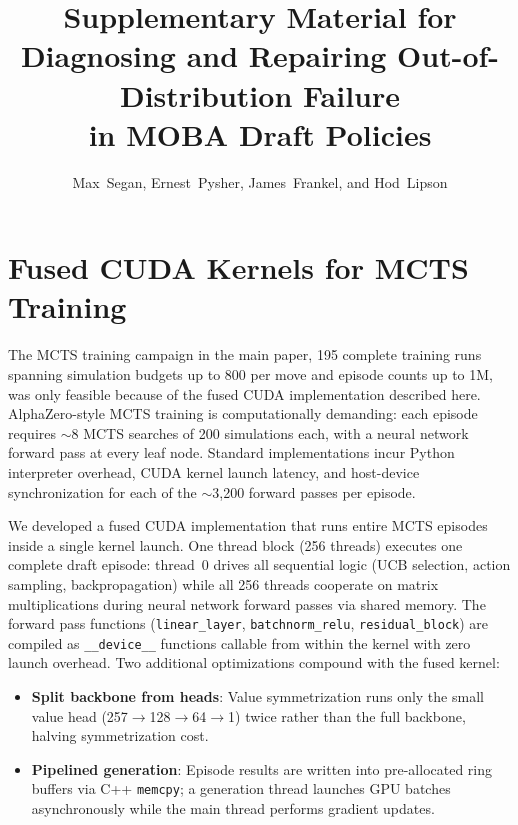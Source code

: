 \documentclass[journal]{IEEEtran}
\newif\ifanonymous
\begin{document}
\title{Supplementary Material for\\ Diagnosing and Repairing Out-of-Distribution Failure\\ in MOBA Draft Policies}
\ifanonymous
\author{Anonymous Authors}
\else
\author{Max~Segan, Ernest~Pysher, James~Frankel, and Hod~Lipson}
\fi
\maketitle

\section{Fused CUDA Kernels for MCTS Training}
\label{sec:cuda}

The MCTS training campaign in the main paper, 195 complete training runs spanning simulation budgets up to 800 per move and episode counts up to 1M, was only feasible because of the fused CUDA implementation described here. AlphaZero-style MCTS training is computationally demanding: each episode requires $\sim$8 MCTS searches of 200 simulations each, with a neural network forward pass at every leaf node. Standard implementations incur Python interpreter overhead, CUDA kernel launch latency, and host-device synchronization for each of the $\sim$3,200 forward passes per episode.

We developed a fused CUDA implementation that runs entire MCTS episodes inside a single kernel launch. One thread block (256 threads) executes one complete draft episode: thread~0 drives all sequential logic (UCB selection, action sampling, backpropagation) while all 256 threads cooperate on matrix multiplications during neural network forward passes via shared memory. The forward pass functions (\texttt{linear\_layer}, \texttt{batchnorm\_relu}, \texttt{residual\_block}) are compiled as \texttt{\_\_device\_\_} functions callable from within the kernel with zero launch overhead. Two additional optimizations compound with the fused kernel:
\begin{itemize}
    \item \textbf{Split backbone from heads}: Value symmetrization runs only the small value head (257$\to$128$\to$64$\to$1) twice rather than the full backbone, halving symmetrization cost.
    \item \textbf{Pipelined generation}: Episode results are written into pre-allocated ring buffers via C++ \texttt{memcpy}; a generation thread launches GPU batches asynchronously while the main thread performs gradient updates.
\end{itemize}
\end{document}
